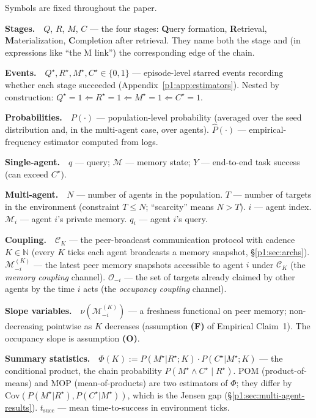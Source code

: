 \documentclass{article}
\begin{document}
Symbols are fixed throughout the paper.

\newcommand{\notentry}[1]{\par\smallskip\noindent\textbf{#1}\ \ }

\notentry{Stages.}$Q$, $R$, $M$, $C$ --- the four stages: \textbf{Q}uery formation, \textbf{R}etrieval, \textbf{M}aterialization, \textbf{C}ompletion after retrieval. They name both the stage and (in expressions like ``the M link'') the corresponding edge of the chain.

\notentry{Events.}$Q^\star, R^\star, M^\star, C^\star \in \{0, 1\}$ --- episode-level starred events recording whether each stage succeeded (Appendix~\ref{p1:app:estimators}). Nested by construction: $Q^\star{=}1 \Leftarrow R^\star{=}1 \Leftarrow M^\star{=}1 \Leftarrow C^\star{=}1$.

\notentry{Probabilities.}$P(\cdot)$ --- population-level probability (averaged over the seed distribution and, in the multi-agent case, over agents). $\hat{P}(\cdot)$ --- empirical-frequency estimator computed from logs.

\notentry{Single-agent.}$q$ --- query; $\mathcal{M}$ --- memory state; $Y$ --- end-to-end task success (can exceed $C^\star$).

\notentry{Multi-agent.}$N$ --- number of agents in the population. $T$ --- number of targets in the environment (constraint $T \le N$; ``scarcity'' means $N > T$). $i$ --- agent index. $\mathcal{M}_i$ --- agent $i$'s private memory. $q_i$ --- agent $i$'s query.

\notentry{Coupling.}$\mathcal{C}_K$ --- the peer-broadcast communication protocol with cadence $K \in \mathbb{N}$ (every $K$ ticks each agent broadcasts a memory snapshot, \S\ref{p1:sec:archs}). $\mathcal{M}_{-i}^{(K)}$ --- the latest peer memory snapshots accessible to agent $i$ under $\mathcal{C}_K$ (the \emph{memory coupling} channel). $\mathcal{O}_{-i}$ --- the set of targets already claimed by other agents by the time $i$ acts (the \emph{occupancy coupling} channel).

\notentry{Slope variables.}$\nu(\mathcal{M}_{-i}^{(K)})$ --- a freshness functional on peer memory; non-decreasing pointwise as $K$ decreases (assumption \textbf{(F)} of Empirical Claim~1). The occupancy slope is assumption \textbf{(O)}.

\notentry{Summary statistics.}$\Phi(K) := P(M^\star|R^\star;K)\cdot P(C^\star|M^\star;K)$ --- the conditional product, the chain probability $P(M^\star \land C^\star \mid R^\star)$. POM (product-of-means) and MOP (mean-of-products) are two estimators of $\Phi$; they differ by $\mathrm{Cov}(P(M^\star|R^\star), P(C^\star|M^\star))$, which is the Jensen gap (\S\ref{p1:sec:multi-agent-results}). $t_{\mathrm{succ}}$ --- mean time-to-success in environment ticks.
\par\smallskip
\end{document}

